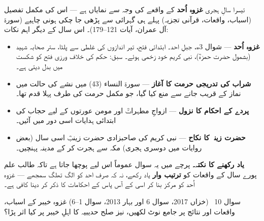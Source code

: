 \begin{hal}
تیسرا سالِ ہجری \textbf{غزوہ اُحد} کے واقعے کی وجہ سے نمایاں ہے --- اس کی
مکمل تفصیل (اسباب، واقعات، قرآنی تجزیہ) پہلے ہی گہرائی سے پڑھی جا چکی ہونی
چاہیے (سورۃ آل عمران، آیات \textenglish{121--179})۔ اس سال کے دیگر اہم
نکات:

\begin{itemize}\setlength{\itemsep}{1pt}
  \item \textbf{غزوہ اُحد} --- شوال \textenglish{3}ھ، جبلِ احد۔ ابتدائی
        فتح، تیر اندازوں کی غلطی سے پلٹا، ستر صحابہ شہید (بشمول حضرت
        حمزہؓ)، نبی کریم \saw خود زخمی ہوئے۔ سبق: حکم کی خلاف ورزی فتح کو
        شکست میں بدل دیتی ہے۔
  \item \textbf{شراب کی تدریجی حرمت کا آغاز} --- سورۃ النساء
        (\textenglish{43}) میں نشے کی حالت میں نماز کے قریب جانے سے منع
        کیا گیا، جو مکمل حرمت کی طرف پہلا قدم تھا۔
  \item \textbf{پردے کے احکام کا نزول} --- ازواجِ مطہراتؓ اور مومن عورتوں
        کے لیے حجاب کی ابتدائی ہدایات اسی دور میں آئیں۔
  \item \textbf{حضرت زینبؓ کا نکاح} --- نبی کریم \saw کی صاحبزادی حضرت
        زینبؓ اسی سال (بعض روایات میں دوسری ہجری) مکہ سے ہجرت کر کے مدینہ
        پہنچیں۔
\end{itemize}

\medskip
\textbf{یاد رکھنے کا نکتہ۔} پرچے میں یہ سوال عموماً اس لیے پوچھا جاتا ہے
تاکہ طالب علم پورے سال کے واقعات کو \textbf{ترتیب وار} یاد رکھے، نہ کہ صرف
احد کو الگ تھلگ سمجھے --- غزوہ اُحد کو مرکز بنا کر اسی کے آس پاس کے احکامات
کا ذکر کر دینا کافی ہے۔
\end{hal}

\begin{sawal}{سوال \textenglish{10} \ \textnormal{\small(خزاں \textenglish{2017}، سوال \textenglish{6} اور بہار \textenglish{2013}، سوال \textenglish{1--6})}}
غزوہ خیبر کے اسباب، واقعات اور نتائج پر جامع نوٹ لکھیں، نیز صلح حدیبیہ کا
اہلِ خیبر پر کیا اثر پڑا؟
\end{sawal}

